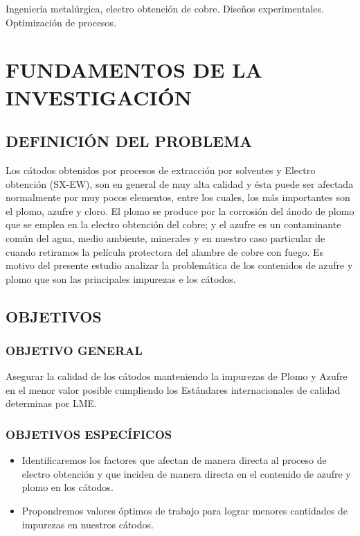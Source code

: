 Ingenier\'ia metal\'urgica, electro obtenci\'on de cobre. Dise\~nos experimentales.  Optimizaci\'on de procesos.

\section{FUNDAMENTOS DE LA INVESTIGACI\'ON}

\subsection{DEFINICI\'ON DEL PROBLEMA}
Los c\'atodos obtenidos por procesos de extracci\'on por solventes y Electro obtenci\'on (SX-EW), son en general de muy alta calidad y \'esta puede ser afectada normalmente por muy pocos elementos, entre los cuales, los más importantes son el plomo, azufre y cloro. 
El plomo se produce por la corrosi\'on del \'anodo de plomo que se emplea en la electro obtenci\'on del cobre; y el azufre es un contaminante com\'un del agua, medio ambiente, minerales y en nuestro caso particular de cuando retiramos la película protectora del alambre de cobre con fuego.
Es motivo del presente estudio analizar la problem\'atica de los contenidos de azufre y plomo que son las principales impurezas e los c\'atodos.

\subsection{OBJETIVOS}

\subsubsection{OBJETIVO GENERAL}
Asegurar la calidad de los c\'atodos manteniendo la impurezas de Plomo y Azufre en el menor valor posible cumpliendo los Est\'andares internacionales de calidad determinas por LME.

\subsubsection{OBJETIVOS ESPEC\'IFICOS}
\begin{itemize}
 \item Identificaremos los factores que afectan de manera directa al proceso de electro obtenci\'on y que inciden de manera directa en el contenido de azufre y plomo en los c\'atodos.
 \item Propondremos valores \'optimos de trabajo para lograr menores cantidades de impurezas en nuestros c\'atodos.
\end{itemize}


